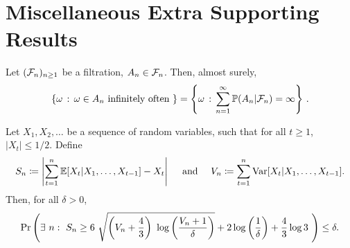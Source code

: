 \clearpage
\section{Miscellaneous Extra Supporting Results}

\begin{lemma}
\label{lem:ebc}
Let $( {\mathcal{F}}_n)_{n \ge 1}$ be a filtration, $A_n \in {\mathcal{F}}_n$.
Then, almost surely, 
\begin{align}
\{ \omega \,: \, \omega \in A_n \text{ infinitely often } \} = \left\{ \omega \, : \, 
\sum_{n=1}^\infty {\mathbb{P}}(A_n|{\mathcal{F}}_n) = \infty \right\}\,.
\end{align}
\end{lemma}

\begin{lemma}
\label{lem:conc_new}
    Let $X_1, X_2, \dots$ be a sequence of random variables, such that for all $t \ge 1$, $|X_t|\le 1/2 $. Define 
\begin{align}
    S_n \coloneqq \left| \sum_{t=1}^n \mathbb{E}[ X_t | X_1, \dots, X_{t-1} ] - X_t \right|
    \quad \text{ and } \quad 
    V_n \coloneqq \sum_{t=1}^n \mathrm{Var}[ X_t | X_1, \ldots, X_{t-1} ].
\end{align}
Then, for all $\delta> 0$,
\begin{align}
    \operatorname*{Pr}{ \left( \exists \ n:\ S_n\ge  6 \ \sqrt{  \left(V_n+ \frac{4}{3} \right) \ \log \left( \frac{  V_n+1  }{ \delta } \right) } + 2\log \left( \frac{1}{\delta} \right)  + \frac{4}{3} \log 3
    ~ \right) } \le \delta.
\end{align}
\end{lemma}

